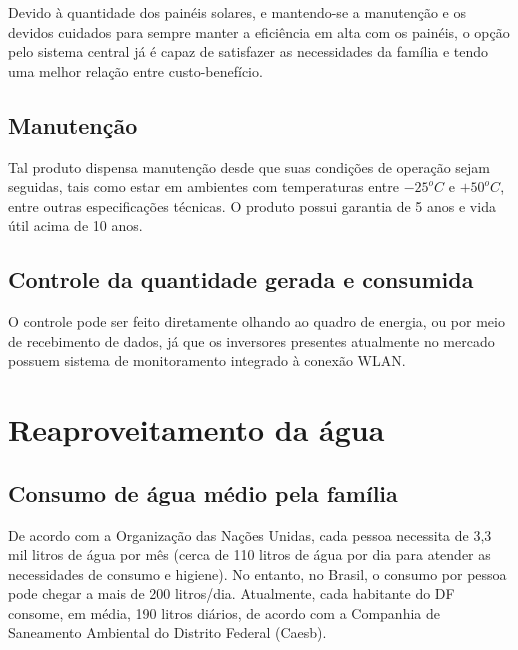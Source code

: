 	Devido à quantidade dos painéis solares, e mantendo-se a manutenção e os devidos cuidados para sempre manter a eficiência em alta com os painéis, o opção pelo sistema central já é capaz de satisfazer as necessidades da família e tendo uma melhor relação entre custo-benefício.

\subsection{Manutenção}

	Tal produto dispensa manutenção desde que suas condições de operação sejam seguidas, tais como estar em ambientes com temperaturas entre $-25^oC$ e $+50^oC$, entre outras especificações técnicas. O produto possui garantia de 5 anos e vida útil acima de 10 anos. 


\subsection{Controle da quantidade gerada e consumida}

	O controle pode ser feito diretamente olhando ao quadro de energia, ou por meio de recebimento de dados, já que os inversores presentes atualmente no mercado possuem sistema de monitoramento integrado à conexão WLAN. 


\section{Reaproveitamento da água}

\subsection{Consumo de água médio pela família}

	De acordo com a Organização das Nações Unidas, cada pessoa necessita de 3,3 mil litros de água por mês (cerca de 110 litros de água por dia para atender as necessidades de consumo e higiene). No entanto, no Brasil, o consumo por pessoa pode chegar a mais de 200 litros/dia. Atualmente, cada habitante do DF consome, em média, 190 litros diários, de acordo com a Companhia de Saneamento Ambiental do Distrito Federal (Caesb). 

